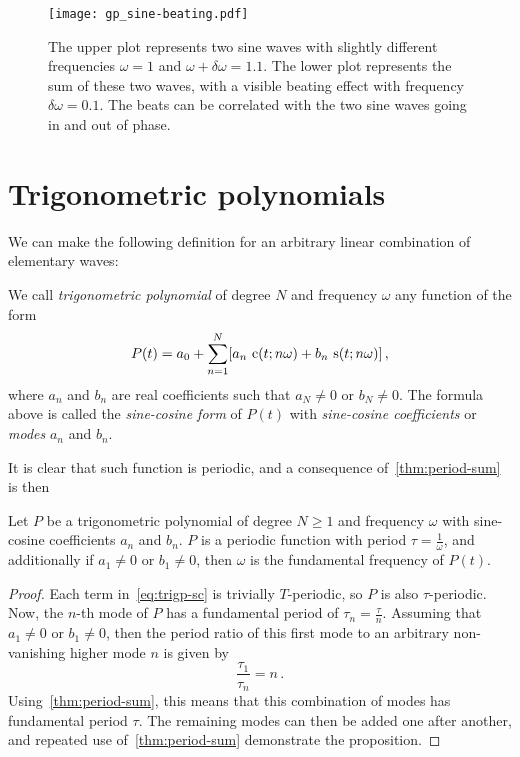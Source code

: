 \begin{figure}
  \centering
  \texttt{[image: gp\_sine-beating.pdf]}
  \caption{The upper plot represents two sine waves with slightly different frequencies
    $\omega=1$ and $\omega+\delta\omega=1.1$. The lower plot represents the sum of these
    two waves, with a visible beating effect with frequency $\delta\omega=0.1$. The beats
  can be correlated with the two sine waves going in and out of phase.}
  \label{fig:beating}
\end{figure}
\section{Trigonometric polynomials}
We can make the following definition for an arbitrary linear combination of elementary
waves:
\begin{definition}
  We call \emph{trigonometric polynomial} of degree $N$ and frequency $\omega$ any
  function of the form
  \begin{equation}
    P(t)=a_0+\sum_{n=1}^N[a_n\,\operatorname{c}(t;n\omega)+b_n\,\operatorname{s}(t;n\omega)]\,,
    \label{eq:trigp-sc}
  \end{equation}
  where $a_n$ and $b_n$ are real coefficients such that $a_N\neq 0$ or $b_N \neq 0$. The
  formula above is called the \emph{sine-cosine form} of $P(t)$ with \emph{sine-cosine
  coefficients} or \emph{modes} $a_n$ and $b_n$.
\end{definition}
It is clear that such function is periodic, and a consequence of~\cref{thm:period-sum} is
then
\begin{proposition}
  Let $P$ be a trigonometric polynomial of degree $N\geq 1$ and frequency $\omega$ with
  sine-cosine coefficients $a_n$ and $b_n$. $P$ is a periodic function with period
  $\tau=\frac{1}{\omega}$, and additionally if $a_1\neq0$ or $b_1\neq0$, then $\omega$ is
  the fundamental frequency of $P(t)$.
\end{proposition}
\begin{proof}
  Each term in~\cref{eq:trigp-sc} is trivially $T$-periodic, so $P$ is also
  $\tau$-periodic. Now, the $n$-th mode of $P$ has a fundamental period of
  $\tau_n=\frac{\tau}{n}$. Assuming that $a_1\neq0$ or $b_1\neq0$, then the period ratio
  of this first mode to an arbitrary non-vanishing higher mode $n$ is given by
  \begin{equation}
    \frac{\tau_1}{\tau_n}=n\,.
  \end{equation}
  Using~\cref{thm:period-sum}, this means that this combination of modes has fundamental
  period $\tau$. The remaining modes can then be added one after another, and repeated use
  of~\cref{thm:period-sum} demonstrate the proposition.
\end{proof}
